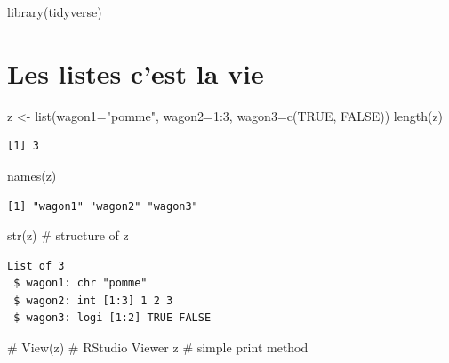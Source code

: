 \documentclass[
  letterpaper,
  DIV=11,
  numbers=noendperiod]{scrreprt}
\newenvironment{Shaded}{\begin{snugshade}}{\end{snugshade}}
\newcommand{\AttributeTok}[1]{\textcolor[rgb]{0.40,0.45,0.13}{#1}}
\newcommand{\CommentTok}[1]{\textcolor[rgb]{0.37,0.37,0.37}{#1}}
\newcommand{\ConstantTok}[1]{\textcolor[rgb]{0.56,0.35,0.01}{#1}}
\newcommand{\DecValTok}[1]{\textcolor[rgb]{0.68,0.00,0.00}{#1}}
\newcommand{\FunctionTok}[1]{\textcolor[rgb]{0.28,0.35,0.67}{#1}}
\newcommand{\NormalTok}[1]{\textcolor[rgb]{0.00,0.23,0.31}{#1}}
\newcommand{\OtherTok}[1]{\textcolor[rgb]{0.00,0.23,0.31}{#1}}
\newcommand{\SpecialCharTok}[1]{\textcolor[rgb]{0.37,0.37,0.37}{#1}}
\newcommand{\StringTok}[1]{\textcolor[rgb]{0.13,0.47,0.30}{#1}}
\begin{document}
\begin{Shaded}
\begin{Highlighting}[]
\FunctionTok{library}\NormalTok{(tidyverse)}
\end{Highlighting}
\end{Shaded}

\hypertarget{les-listes-cest-la-vie}{%
\section{Les listes c'est la vie}\label{les-listes-cest-la-vie}}

\begin{Shaded}
\begin{Highlighting}[]
\NormalTok{z }\OtherTok{\textless{}{-}} \FunctionTok{list}\NormalTok{(}\AttributeTok{wagon1=}\StringTok{"pomme"}\NormalTok{, }\AttributeTok{wagon2=}\DecValTok{1}\SpecialCharTok{:}\DecValTok{3}\NormalTok{, }\AttributeTok{wagon3=}\FunctionTok{c}\NormalTok{(}\ConstantTok{TRUE}\NormalTok{, }\ConstantTok{FALSE}\NormalTok{))}
\FunctionTok{length}\NormalTok{(z)}
\end{Highlighting}
\end{Shaded}

\begin{verbatim}
[1] 3
\end{verbatim}

\begin{Shaded}
\begin{Highlighting}[]
\FunctionTok{names}\NormalTok{(z)}
\end{Highlighting}
\end{Shaded}

\begin{verbatim}
[1] "wagon1" "wagon2" "wagon3"
\end{verbatim}

\begin{Shaded}
\begin{Highlighting}[]
\FunctionTok{str}\NormalTok{(z)    }\CommentTok{\# structure of z}
\end{Highlighting}
\end{Shaded}

\begin{verbatim}
List of 3
 $ wagon1: chr "pomme"
 $ wagon2: int [1:3] 1 2 3
 $ wagon3: logi [1:2] TRUE FALSE
\end{verbatim}

\begin{Shaded}
\begin{Highlighting}[]
\CommentTok{\# View(z) \# RStudio Viewer}
\NormalTok{z         }\CommentTok{\# simple print method}
\end{Highlighting}
\end{Shaded}
\end{document}
